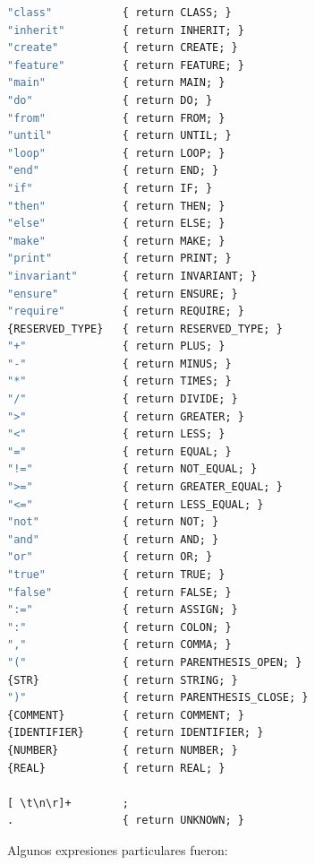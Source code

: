 \documentclass[a4paper,12pt]{article}
\begin{document}
\begin{lstlisting}[language=Eiffel, style=myeiffel]
"class"           { return CLASS; }
"inherit"         { return INHERIT; }
"create"          { return CREATE; }
"feature"         { return FEATURE; }
"main"            { return MAIN; }
"do"              { return DO; }
"from"            { return FROM; }
"until"           { return UNTIL; }
"loop"            { return LOOP; }
"end"             { return END; }
"if"              { return IF; }
"then"            { return THEN; }
"else"            { return ELSE; }
"make"            { return MAKE; }
"print"           { return PRINT; }
"invariant"       { return INVARIANT; }
"ensure"          { return ENSURE; }
"require"         { return REQUIRE; }
{RESERVED_TYPE}   { return RESERVED_TYPE; }
"+"               { return PLUS; }
"-"               { return MINUS; }
"*"               { return TIMES; }
"/"               { return DIVIDE; }
">"               { return GREATER; }
"<"               { return LESS; }
"="               { return EQUAL; }
"!="              { return NOT_EQUAL; }
">="              { return GREATER_EQUAL; }
"<="              { return LESS_EQUAL; }
"not"             { return NOT; }
"and"             { return AND; }
"or"              { return OR; }
"true"            { return TRUE; }
"false"           { return FALSE; }
":="              { return ASSIGN; }
":"               { return COLON; }
","               { return COMMA; }
"("               { return PARENTHESIS_OPEN; }
{STR}             { return STRING; }
")"               { return PARENTHESIS_CLOSE; }
{COMMENT}         { return COMMENT; }
{IDENTIFIER}      { return IDENTIFIER; }
{NUMBER}          { return NUMBER; }
{REAL}            { return REAL; }

[ \t\n\r]+        ;
.                 { return UNKNOWN; }
\end{lstlisting}

\newpage

\noindent
Algunos expresiones particulares fueron:
\end{document}
